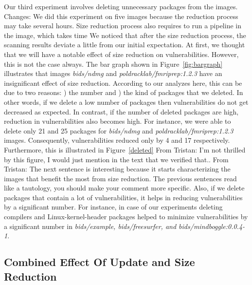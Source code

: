\documentclass[a4paper,num-refs]{oup-contemporary}
\newcommand{\change}[2]{\color{cyan}Changes: #1\color{black}}
\newcommand{\rom}[1]{\lowercase\expandafter{\romannumeral #1\relax}}
\newcommand{\tristan}[1]{\color{blue}From Tristan: #1\color{black}}
\begin{document}
Our third experiment involves deleting unnecessary packages from the images.
\change{We did this experiment on five images because the reduction process may take
several hours. Size reduction process also requires 
to run a pipeline in the image, which takes time}. We noticed that
after the size reduction process, the scanning results deviate a little from our initial expectation.
At first, we thought that we will have a notable effect of size reduction on
vulnerabilities. However, this is not the case always. The bar graph shown in
Figure~\ref{fig:bargraph} illustrates that images \textit{bids/ndmg} and
\textit{poldracklab/fmriprep:1.2.3} have an insignificant effect of size reduction.
According to our analyzes here, this can be due to two reasons: \rom{1}) the number
and \rom{2}) the kind of packages that we deleted. In other
words, if we delete a low number of packages then vulnerabilities do not get decreased as expected.
In contrast, if the number of deleted packages are high, reduction
in vulnerabilities also becomes high. For instance, we were able to delete only 21 and 25 packages for 
\textit{bids/ndmg} and \textit{poldracklab/fmriprep:1.2.3} images. Consequently, vulnerabilities
reduced only by 4 and 17 respectively. Furthermore, this is illustrated in Figure~\ref{deleted} \tristan{I'm not thrilled by this figure, I would 
just mention in the text that we verified that.}.
\tristan{The next sentence is interesting because it starts characterizing the images that benefit the most 
from size reduction. The previous sentences read like a tautology, you should make your comment more specific.} 
Also, if we delete packages that contain a lot of vulnerabilities, it helps in reducing
vulnerabilities by a significant number. For instance, in case of our experiments
deleting compilers and Linux-kernel-header packages helped to minimize vulnerabilities
by a significant number in \textit{bids/example, bids/freesurfer, and bids/mindboggle:0.0.4-1}. 

\subsection{Combined Effect Of Update and Size Reduction}
\end{document}
